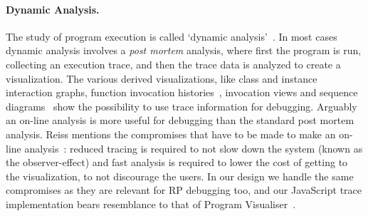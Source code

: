 \paragraph{Dynamic Analysis.}
The study of program execution is called `dynamic analysis'~\cite{cornelissen2009systematic}.
In most cases dynamic analysis involves a \textit{post mortem} analysis, 
where first the program is run, collecting an execution trace, and then the trace data is analyzed to create a visualization.
The various derived visualizations, like class and instance interaction graphs, function invocation histories~\cite{lange1995program}, invocation views and sequence diagrams~\cite{cornelissen2008execution} show the possibility to use trace information for debugging.
Arguably an on-line analysis is more useful for debugging than the standard post mortem analysis. Reiss mentions the compromises that have to be made to make an on-line analysis~\cite{reiss2006visualizing}: 
reduced tracing is required to not slow down the system (known as the observer-effect) and
fast analysis is required to lower the cost of getting to the visualization, to not discourage the users.
In our design we handle the same compromises as they are relevant for RP debugging too, and our JavaScript trace implementation bears resemblance to that of Program Visualiser~\cite{lange1995program}.




